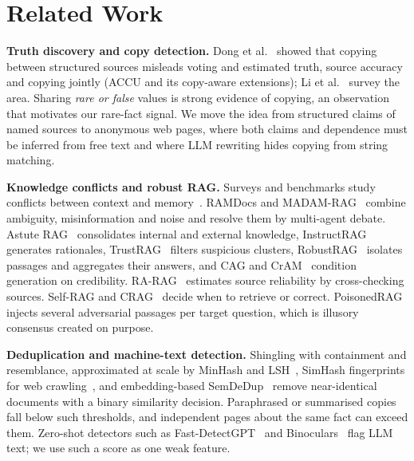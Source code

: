 \documentclass[sigconf,review,anonymous]{acmart}
\newcommand{\para}[1]{\smallskip\noindent\textbf{#1}\enspace}
\begin{document}
\section{Related Work}
\para{Truth discovery and copy detection.} Dong et al.~\cite{dong2009integrating} showed that copying between
structured sources misleads voting and estimated truth, source accuracy and copying jointly (ACCU and its copy-aware
extensions); Li et al.~\cite{li2015truthsurvey} survey the area. Sharing \emph{rare or false} values is strong
evidence of copying, an observation that motivates our rare-fact signal. We move the idea from structured claims of
named sources to anonymous web pages, where both claims and dependence must be inferred from free text and where LLM
rewriting hides copying from string matching.

\para{Knowledge conflicts and robust RAG.} Surveys and benchmarks study conflicts between context and
memory~\cite{xu2024conflicts,wu2024clasheval,ming2025faitheval,su2024conflictbank,chen2026ragknow}. RAMDocs and
MADAM-RAG~\cite{wang2025ramdocs} combine ambiguity, misinformation and noise and resolve them by multi-agent debate.
Astute RAG~\cite{wang2024astute} consolidates internal and external knowledge, InstructRAG~\cite{wei2025instructrag}
generates rationales, TrustRAG~\cite{zhou2025trustrag} filters suspicious clusters, RobustRAG~\cite{xiang2024robustrag}
isolates passages and aggregates their answers, and CAG and CrAM~\cite{pan2024cag,deng2024cram} condition generation on
credibility. RA-RAG~\cite{hwang2024rarag} estimates source reliability by cross-checking sources. Self-RAG and
CRAG~\cite{asai2023selfrag,yan2024crag} decide when to retrieve or correct. PoisonedRAG~\cite{zou2024poisonedrag}
injects several adversarial passages per target question, which is illusory consensus created on purpose.

\para{Deduplication and machine-text detection.} Shingling with containment and resemblance, approximated at scale by
MinHash and LSH~\cite{broder1997resemblance}, SimHash fingerprints for web crawling~\cite{manku2007nearduplicates}, and
embedding-based SemDeDup~\cite{abbas2023semdedup} remove near-identical documents with a binary similarity decision. Paraphrased or summarised copies fall below such
thresholds, and independent pages about the same fact can exceed them. Zero-shot detectors such as
Fast-DetectGPT~\cite{bao2024fastdetectgpt} and Binoculars~\cite{hans2024binoculars} flag LLM text; we use such a score
as one weak feature.
\end{document}
